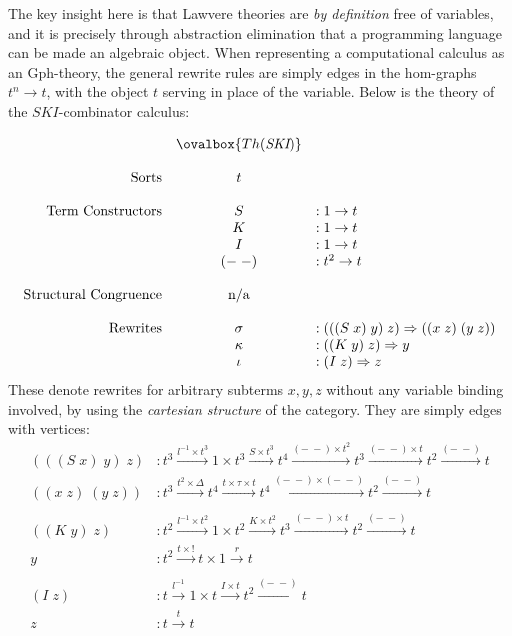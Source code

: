 \documentclass[a4paper,UKenglish]{article}
\theoremstyle{definition}
\newcommand{\Gph}{\mathrm{Gph}}
\begin{document}
The key insight here is that Lawvere theories are \textit{by definition} free of variables, and it is precisely through abstraction elimination that a programming language can be made an algebraic object. When representing a computational calculus as an $\Gph$-theory, the general rewrite rules are simply edges in the hom-graphs $t^n \to t$, with the object $t$ serving in place of the variable. Below is the theory of the $SKI$-combinator calculus:

\[\begin{array}{rcl}
& \ovalbox{Th(\textit{SKI})} &\\\\
\text{Sorts} & t &\\\\
\text{Term Constructors} & S & :1 \to t\\
& K & :1 \to t\\
& I & :1 \to t\\
& (-\; -) & : t^2 \to t\\\\
\text{Structural Congruence} & \text{n/a} &\\\\
\mathrm{Rewrites} & \sigma & :(((S\; x)\; y)\; z) \Rightarrow ((x\; z)\; (y\; z))\\
& \kappa & :((K\; y)\; z) \Rightarrow y\\
& \iota & :(I\; z) \Rightarrow z\\
\end{array}\]
These denote rewrites for arbitrary subterms $x, y, z$ without any variable binding involved, by using the \textit{cartesian structure} of the category. They are simply edges with vertices:
\[\begin{array}{rl}
(((S\; x)\; y)\; z)&: t^3 \xrightarrow{l^{-1} \times t^3} 1\times t^3 \xrightarrow{S \times t^3} t^4 \xrightarrow{(-\;-)\times t^2} t^3 \xrightarrow{(-\;-) \times t} t^2 \xrightarrow{(-\;-)} t\\
((x\; z)\; (y\; z))&: t^3 \xrightarrow{t^2 \times \Delta} t^4 \xrightarrow{t \times \tau \times t} t^4 \xrightarrow{(-\;-) \times (-\;-)} t^2 \xrightarrow{(-\;-)} t\\\\
((K\; y)\; z)&: t^2 \xrightarrow{l^{-1} \times t^2} 1\times t^2 \xrightarrow{K \times t^2} t^3 \xrightarrow{(-\;-)\times t} t^2 \xrightarrow{(-\;-)} t\\
y&: t^2 \xrightarrow{t \times !} t \times 1 \xrightarrow{r} t\\\\
(I\; z)&: t \xrightarrow{l^{-1}} 1\times t \xrightarrow{I \times t} t^2 \xrightarrow{(-\;-)} t\\
z&: t \xrightarrow{t} t
\end{array}\]
\end{document}
